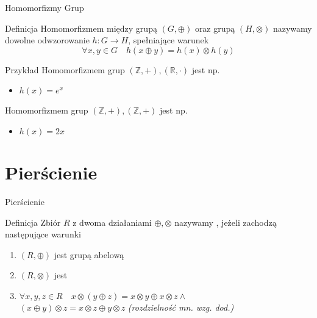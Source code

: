 \documentclass{beamer}
\begin{document}
\begin{frame}{Homomorfizmy Grup}
    \begin{block}{Definicja}
        Homomorfizmem między grupą $(G, \oplus)$ oraz grupą $(H, \otimes)$ nazywamy dowolne odwzorowanie 
        $h : G \rightarrow H$, spełniające warunek
        $$ \forall x,y \in G \quad h(x \oplus y) = h(x) \otimes h(y)$$
    \end{block}
    \pause 
    \begin{exampleblock}{Przykład}
        Homomorfizmem grup $(\mathbb{Z}, +), (\mathbb{R}, \cdot)$ jest np.
        \begin{itemize}
            \item $h(x) = e^x$
        \end{itemize} 
        Homomorfizmem grup $(\mathbb{Z}, +), (\mathbb{Z}, +)$ jest np. 
        \begin{itemize}
            \item $h(x) = 2x$ 
        \end{itemize}
    \end{exampleblock}
\end{frame}

\section{Pierścienie}

\begin{frame}{Pierścienie}
    \begin{block}{Definicja}
        Zbiór $R$ z dwoma działaniami $\oplus, \otimes$ nazywamy   , jeżeli zachodzą następujące warunki
        \begin{enumerate}
            \item $(R, \oplus)$ jest grupą abelową 
            \item $(R, \otimes)$ jest   
            \item $\forall x,y,z \in R \quad x \otimes (y \oplus z) = x \otimes y \oplus x \otimes z \land $ \\ $(x \oplus y) \otimes z = x \otimes z \oplus y \otimes z$ \hfill \textit{(rozdzielność mn. wzg. dod.)} 
        \end{enumerate}
    \end{block}
\end{frame}
\end{document}
